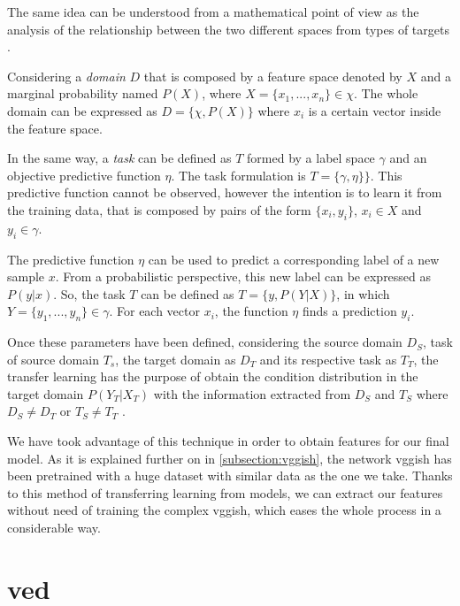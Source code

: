 	The same idea can be understood from a mathematical point of view as the analysis of the relationship between the two different spaces from types of targets \cite{Pan2010}. 
	
	Considering a \textit{domain} $D$ that is composed by a feature space denoted by $X$ and a marginal probability named $P(X)$, where $X = \{x_1,..., x_n\} \in \chi$. The whole domain can be expressed as $D = \{\chi, P(X)\}$ where $x_{i}$ is a certain vector inside the feature space.
	
	In the same way, a \textit{task} can be defined as $T$ formed by a label space $\gamma$ and an objective predictive function $\eta$. The task formulation is $T = \{\gamma, \eta\}\}$. This predictive function cannot be observed, however the intention is to learn it from the training data, that is composed by pairs of the form $\{x_i, y_i\}$, $x_i \in X$ and $y_i \in \gamma$.
	
	The predictive function $\eta$ can be used to predict a corresponding label of a new sample $x$. From a probabilistic perspective, this new label can be expressed as $P(y|x)$. So, the task $T$ can be defined as $T = \{y, P(Y|X)\}$, in which $Y = \{y_1,..., y_n\} \in \gamma$. For each vector $x_i$, the function $\eta$ finds a prediction $y_i$.
	
	Once these parameters have been defined, considering the source domain $D_S$, task of source domain $T_s$, the target domain as $D_T$ and its respective task as $T_T$, the transfer learning has the purpose of obtain the condition distribution in the target domain $P(Y_T|X_T)$ with the information extracted from $D_S$ and $T_S$ where $D_S \neq D_T$ or $T_S \neq T_T$ \cite{Ruder2017}.
	
	We have took advantage of this technique in order to obtain features for our final model. As it is explained further on in \ref{subsection:vggish}, the network \acrshort{vgg}ish has been pretrained with a huge dataset with similar data as the one we take. Thanks to this method of transferring learning from models, we can extract our features without need of training the complex \acrshort{vgg}ish, which eases the whole process in a considerable way.
	
\section{\acrlong{ved}}
\label{section:ved}

